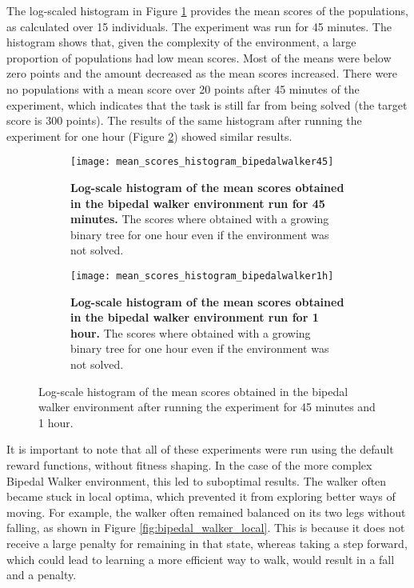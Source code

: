 The log-scaled histogram in Figure \ref{fig:bipedal_histogram1} provides the mean scores of the populations, as calculated over 15 individuals. The experiment was run for 45 minutes. The histogram shows that, given the complexity of the environment, a large proportion of populations had low mean scores. Most of the means were below zero points and the amount decreased as the mean scores increased. There were no populations with a mean score over 20 points after 45 minutes of the experiment, which indicates that the task is still far from being solved (the target score is 300 points). The results of the same histogram after running the experiment for one hour (Figure \ref{fig:bipedal_histogram2}) showed similar results.

\begin{figure}[!ht]
    \centering
    \begin{subfigure}{0.48\textwidth}
		\texttt{[image: mean\_scores\_histogram\_bipedalwalker45]}
		\caption[Log-scale histogram of the mean scores obtained in the bipedal walker environment run for 45 minutes]{
			\textbf{Log-scale histogram of the mean scores obtained in the bipedal walker environment run for 45 minutes.} The scores where obtained with a growing binary tree for one hour even if the environment was not solved.
			}
		\label{fig:bipedal_histogram1}
    \end{subfigure}%
    \hspace{1em}
    \begin{subfigure}{0.48\textwidth}
        \texttt{[image: mean\_scores\_histogram\_bipedalwalker1h]}
		\caption[log-scale histogram of the mean scores obtained in the bipedal walker environment run for 1 hour]{
  			\textbf{Log-scale histogram of the mean scores obtained in the bipedal walker environment run for 1 hour.} The scores where obtained with a growing binary tree for one hour even if the environment was not solved.
  			}
		\label{fig:bipedal_histogram2}
    \end{subfigure}
    \caption{Log-scale histogram of the mean scores obtained in the bipedal walker environment after running the experiment for 45 minutes and 1 hour.}
    \label{Log-scale histogram of the mean scores obtained in the bipedal walker}
\end{figure}

It is important to note that all of these experiments were run using the default reward functions, without fitness shaping. In the case of the more complex Bipedal Walker environment, this led to suboptimal results. The walker often became stuck in local optima, which prevented it from exploring better ways of moving. For example, the walker often remained balanced on its two legs without falling, as shown in Figure \ref{fig:bipedal_walker_local}. This is because it does not receive a large penalty for remaining in that state, whereas taking a step forward, which could lead to learning a more efficient way to walk, would result in a fall and a penalty.

